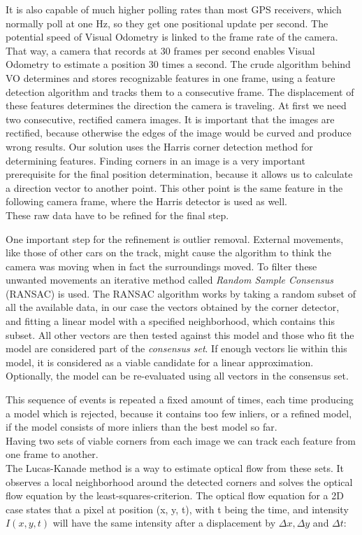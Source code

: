 It is also capable of much higher polling rates than most GPS receivers, which normally poll at one Hz, so they get one positional update per second. The potential speed of Visual Odometry is linked to the frame rate of the camera. That way, a camera that records at 30 frames per second enables Visual Odometry to estimate a position 30 times a second. 
The crude algorithm behind VO determines and stores recognizable features in one frame, using a feature detection algorithm and tracks them to a consecutive frame. The displacement of these features determines the direction the camera is traveling.
At first we need two consecutive, rectified camera images. It is important that the images are rectified, because otherwise the edges of the image would be curved and produce wrong results.
\clearpage
Our solution uses the Harris corner detection method \cite{harris88} for determining features. Finding corners in an image is a very important prerequisite for the final position determination, because it allows us to calculate a direction vector to another point. This other point is the same feature in the following camera frame, where the Harris detector is used as well.\\
These raw data have to be refined for the final step.

One important step for the refinement is outlier removal. External movements, like those of other cars on the track, might cause the algorithm to think the camera was moving when in fact the surroundings moved.
To filter these unwanted movements an iterative method called \textit{Random Sample Consensus} (RANSAC) is used. 
The RANSAC algorithm works by taking a random subset of all the available data, in our case the vectors obtained by the corner detector, and fitting a linear model with a specified neighborhood, which contains this subset. All other vectors are then tested against this model and those who fit the model are considered part of the \textit{consensus set}.
If enough vectors lie within this model, it is considered as a viable candidate for a linear approximation. Optionally, the model can be re-evaluated using all vectors in the consensus set.

This sequence of events is repeated a fixed amount of times, each time producing a model which is rejected, because it contains too few inliers, or a refined model, if the model consists of more inliers than the best model so far.\\
Having two sets of viable corners from each image we can track each feature from one frame to another.\\
The Lucas-Kanade method \cite{lucas81, tomasi91} is a way to estimate optical flow from these sets. It observes a local neighborhood around the detected corners and solves the optical flow equation by the least-squares-criterion.
\clearpage
The optical flow equation for a 2D case states that a pixel at position (x, y, t), with t being the time, and intensity $I(x, y, t)$ will have the same intensity after a displacement by $\Delta x, \Delta y$ and $\Delta t$:

